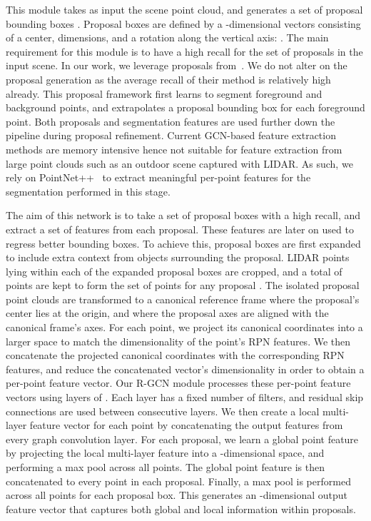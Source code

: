 \documentclass[10pt,twocolumn,letterpaper]{article}
\begin{document}
This module takes as input the scene point cloud, and generates a set of proposal bounding boxes \Bc.
Proposal boxes  are defined by a -dimensional vectors consisting of a center, dimensions, and a rotation along the vertical axis: .
The main requirement for this module is to have a high recall for the set of proposals \Bc in the input scene.
In our work, we leverage proposals from~\cite{shi2019pointrcnn}.
We do not alter on the proposal generation as the average recall of their method is relatively high already.
This proposal framework first learns to segment foreground and background points, and extrapolates a proposal bounding box  for each foreground point.
Both proposals and segmentation features are used further down the pipeline during proposal refinement.
Current GCN-based feature extraction methods are memory intensive hence not suitable for feature extraction from large point clouds such as an outdoor scene captured with LIDAR.
As such, we rely on PointNet++~\cite{qi2017pointnet++} to extract meaningful per-point features for the segmentation performed in this stage.





The aim of this network is to take a set of proposal boxes \Bc with a high recall, and extract a set of features from each proposal.
These features are later on used to regress better bounding boxes.
To achieve this, proposal boxes are first expanded to include extra context from objects surrounding the proposal.
LIDAR points lying within each of the expanded proposal boxes are cropped, and a total of  points are kept to form the set of points  for any proposal .
The isolated proposal point clouds are transformed to a canonical reference frame where the proposal's center lies at the origin, and where the proposal axes are aligned with the canonical frame's axes.
For each point, we project its canonical coordinates into a larger space to match the dimensionality of the point's RPN features.
We then concatenate the projected canonical coordinates with the corresponding RPN features, and reduce the concatenated vector's dimensionality in order to obtain a per-point feature vector.
Our R-GCN module processes these per-point feature vectors using  layers of \MRGCN. 
Each layer has a fixed number  of filters, and residual skip connections are used between consecutive layers.
We then create a local multi-layer feature vector for each point by concatenating the output features from every graph convolution layer.
For each proposal, we learn a global point feature by projecting the local multi-layer feature into a -dimensional space, and performing a max pool across all points.
The global point feature is then concatenated to every point in each proposal.
Finally, a max pool is performed across all points for each proposal box.
This generates an -dimensional output feature vector that captures both global and local information within proposals.
\end{document}
